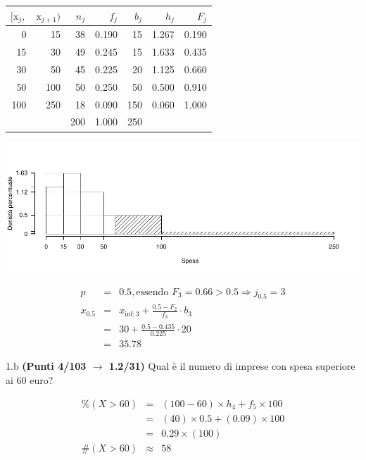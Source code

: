 \documentclass[
  11pt,
]{book}
\theoremstyle{mytheoremstyle}
\theoremstyle{mydefstyle}
\newenvironment{sol}
  {
  \begin{tcolorbox}[enhanced,breakable,arc=0.1mm,boxrule=1pt,colback=white,colframe=iblue,
  title=\bf \fontfamily{lmss}\selectfont \hspace{.5 cm} Soluzione,drop fuzzy shadow]

}{
\end{tcolorbox}
  }
\begin{document}
\begin{sol}

\begin{table}[H]
\centering
\begin{tabular}{rrrrrrr}
\toprule
$[\text{x}_j,$ & $\text{x}_{j+1})$ & $n_j$ & $f_j$ & $b_j$ & $h_j$ & $F_j$\\
\midrule
0 & 15 & 38 & 0.190 & 15 & 1.267 & 0.190\\
15 & 30 & 49 & 0.245 & 15 & 1.633 & 0.435\\
30 & 50 & 45 & 0.225 & 20 & 1.125 & 0.660\\
50 & 100 & 50 & 0.250 & 50 & 0.500 & 0.910\\
100 & 250 & 18 & 0.090 & 150 & 0.060 & 1.000\\
 &  & 200 & 1.000 & 250 &  & \\
\bottomrule
\end{tabular}
\end{table}

\begin{center}\includegraphics{Esami_passati_con_soluzioni_files/figure-latex/2023-76,-1} \end{center}

\begin{eqnarray*}
  p &=&  0.5 , \text{essendo }F_{ 3 }= 0.66  > 0.5  \Rightarrow j_{ 0.5 }= 3 \\
  x_{ 0.5 } &=& x_{\text{inf}; 3 } + \frac{ { 0.5 } - F_{ 2 }} {f_{ 3 }} \cdot b_{ 3 } \\
            &=&  30  + \frac {{ 0.5 } -  0.435 } { 0.225 } \cdot  20  \\
            &=&  35.78 
\end{eqnarray*}

\end{sol}

1.b \textbf{(Punti 4/103 \(\rightarrow\) 1.2/31)} Qual è il numero di imprese con spesa superiore ai 60 euro?

\begin{sol}
\begin{eqnarray*}
     \%(X> 60 ) &=& ( 100 - 60 )\times h_{ 4 }+ f_{ 5 }\times 100 \\
              &=& ( 40 )\times 0.5 + ( 0.09 )\times 100 \\
              &=&  0.29 \times(100)\\
     \#(X> 60 ) &\approx& 58 
         \end{eqnarray*}

\end{sol}
\end{document}
